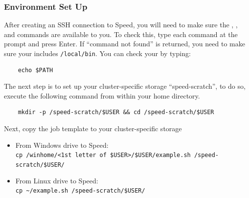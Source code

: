 \subsubsection{Environment Set Up}
\label{sect:envsetup}

After creating an SSH connection to Speed, you will need to make sure the 
, , and  commands are available to you. 
To check this, type each command at the prompt and press Enter.
If ``command not found'' is returned, you need to make sure your  includes \texttt{/local/bin}.
You can check your  by typing:\\
\begin{verbatim}
    echo $PATH
\end{verbatim}

%
%
%
%
%
%

\noindent The next step is to set up your cluster-specific storage ``speed-scratch'', to do so, execute the following command from within your
home directory. 
\begin{verbatim}
    mkdir -p /speed-scratch/$USER && cd /speed-scratch/$USER
\end{verbatim}

\noindent Next, copy the job template to your cluster-specific storage
\begin{itemize}
    \item From Windows drive to Speed:\\ 
    \verb|cp /winhome/<1st letter of $USER>/$USER/example.sh /speed-scratch/$USER/|
    \item From Linux drive to Speed:\\
    \verb|cp ~/example.sh /speed-scratch/$USER/|
\end{itemize}

